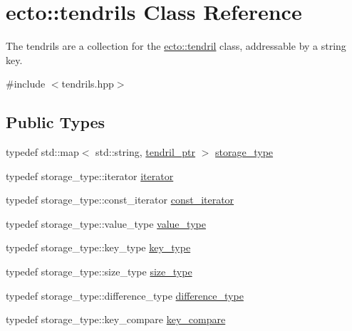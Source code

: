 \hypertarget{classecto_1_1tendrils}{\section{ecto\-:\-:tendrils \-Class \-Reference}
\label{classecto_1_1tendrils}
}


\-The tendrils are a collection for the \hyperlink{classecto_1_1tendril}{ecto\-::tendril} class, addressable by a string key.  




{\ttfamily \#include $<$tendrils.\-hpp$>$}

\subsection*{\-Public \-Types}
\begin{DoxyCompactItemize}
\item 
typedef std\-::map$<$ std\-::string, \*
\hyperlink{namespaceecto_a84fb5f6130275382e5cbeb5fdececa78}{tendril\-\_\-ptr} $>$ \hyperlink{classecto_1_1tendrils_a3647503829f1b29de220584d265c63fb}{storage\-\_\-type}
\item 
typedef storage\-\_\-type\-::iterator \hyperlink{classecto_1_1tendrils_a6f0b7bd6e3a03f047351303630b889e0}{iterator}
\item 
typedef \*
storage\-\_\-type\-::const\-\_\-iterator \hyperlink{classecto_1_1tendrils_a86df9983555ca4ebdae8b1d36aa4bbd8}{const\-\_\-iterator}
\item 
typedef storage\-\_\-type\-::value\-\_\-type \hyperlink{classecto_1_1tendrils_a736870868e76890e198448924cecdd4f}{value\-\_\-type}
\item 
typedef storage\-\_\-type\-::key\-\_\-type \hyperlink{classecto_1_1tendrils_aa6165c6ab72d93cd56796ea81e450245}{key\-\_\-type}
\item 
typedef storage\-\_\-type\-::size\-\_\-type \hyperlink{classecto_1_1tendrils_af3726f822a4fd60a1095bba31f1926ef}{size\-\_\-type}
\item 
typedef \*
storage\-\_\-type\-::difference\-\_\-type \hyperlink{classecto_1_1tendrils_a919b9a4666ad641148b6a432a1fd08fb}{difference\-\_\-type}
\item 
typedef storage\-\_\-type\-::key\-\_\-compare \hyperlink{classecto_1_1tendrils_aa347bebda44153437e8554a25bed9e6b}{key\-\_\-compare}
\end{DoxyCompactItemize}
